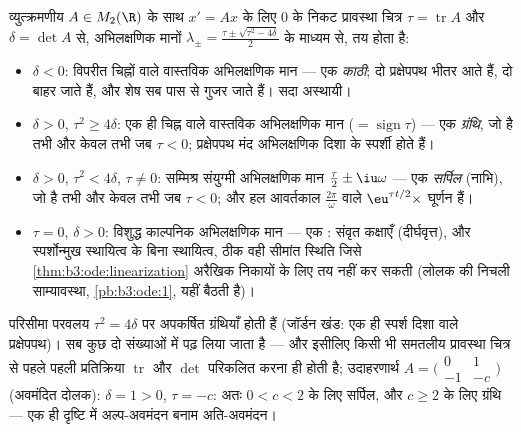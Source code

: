 \begin{example}[समतल, वर्गीकृत]
\label{ex:b3:ode:planeclassification}
व्युत्क्रमणीय $A \in M_2(\R)$ के साथ $x' = Ax$ के लिए $0$ के निकट प्रावस्था
चित्र $\tau = \operatorname{tr}A$ और $\delta = \det A$ से, अभिलक्षणिक मानों $\lambda_\pm
= \frac{\tau \pm \sqrt{\tau^2 - 4\delta}}2$ के माध्यम से, तय
होता है:
\begin{itemize}
  \item $\delta < 0$: विपरीत चिह्नों वाले वास्तविक अभिलक्षणिक मान ---
        एक \emph{काठी}; दो प्रक्षेपपथ भीतर आते हैं, दो बाहर जाते
        हैं, और शेष सब पास से गुजर जाते हैं। सदा अस्थायी।
  \item $\delta > 0$, $\tau^2 \geq 4\delta$: एक ही चिह्न वाले वास्तविक अभिलक्षणिक मान
        ($= \operatorname{sign}\tau$) --- एक \emph{ग्रंथि}, जो  है तभी और केवल
        तभी जब $\tau < 0$; प्रक्षेपपथ मंद अभिलक्षणिक दिशा के स्पर्शी
        होते हैं।
  \item $\delta > 0$, $\tau^2 < 4\delta$, $\tau \neq 0$: सम्मिश्र संयुग्मी अभिलक्षणिक मान
        $\frac\tau2 \pm
        \iu\omega$ --- एक \emph{सर्पिल} (नाभि), जो  है तभी और
        केवल तभी जब $\tau < 0$; और हल आवर्तकाल $\frac{2\pi}\omega$ वाले $\eu^{\tau t/2}\times$ घूर्णन
        हैं।
  \item $\tau = 0$, $\delta > 0$: विशुद्ध काल्पनिक अभिलक्षणिक मान --- एक
        \emph{}: संवृत कक्षाएँ (दीर्घवृत्त), और स्पर्शोन्मुख
        स्थायित्व के बिना स्थायित्व, ठीक वही सीमांत स्थिति जिसे
        \cref{thm:b3:ode:linearization} अरैखिक निकायों के लिए तय नहीं कर सकती (लोलक की
        निचली साम्यावस्था, \cref{pb:b3:ode:1}, यहीं बैठती है)।
\end{itemize}
परिसीमा परवलय $\tau^2 = 4\delta$ पर अपकर्षित ग्रंथियाँ होती हैं (जॉर्डन खंड:
एक ही स्पर्श दिशा वाले प्रक्षेपपथ)। सब कुछ दो संख्याओं में पढ़
लिया जाता है --- और इसीलिए किसी भी समतलीय प्रावस्था चित्र से पहले
पहली प्रतिक्रिया $\operatorname{tr}$ और $\det$ परिकलित करना ही होती है;
उदाहरणार्थ $A = \bigl(\begin{smallmatrix}0 & 1\\ -1 &
-c\end{smallmatrix}\bigr)$ (अवमंदित दोलक): $\delta = 1 >
0$, $\tau = -c$: अतः $0 < c < 2$ के लिए
 सर्पिल, और $c \geq 2$ के लिए  ग्रंथि --- एक ही दृष्टि में
अल्प-अवमंदन बनाम अति-अवमंदन।
\end{example}

